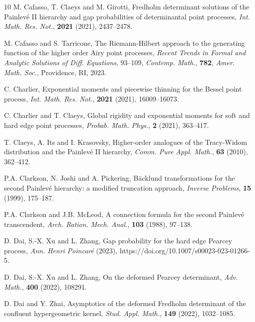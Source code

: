 \documentclass[11pt,a4paper]{article}
\numberwithin{equation}{section}
\begin{document}
\begin{thebibliography}{10}
M. Cafasso, T. Claeys and M. Girotti,
Fredholm determinant solutions of the
Painlev\'{e} II hierarchy and gap probabilities of determinantal point processes, {\it Int. Math. Res. Not.}, {\bf 2021} (2021), 2437--2478.


M. Cafasso and S. Tarricone,
The Riemann-Hilbert approach to the generating function of the higher order Airy point processes, {\it Recent Trends in Formal and Analytic Solutions of Diff. Equations}, 93--109, {\it Contemp. Math.}, {\bf 782}, {\it Amer. Math. Soc.}, Providence, RI, 2023. 

C. Charlier, Exponential moments and piecewise thinning for the Bessel point process, {\it Int. Math. Res. Not.}, {\bf 2021} (2021), 16009--16073.

C. Charlier and T. Claeys, Global rigidity and exponential moments for soft and hard edge point processes, {\it Probab. Math. Phys.}, {\bf 2} (2021), 363--417.





T. Claeys, A. Its and I. Krasovsky, Higher-order analogues of the Tracy-Widom
distribution and the Painlev\'{e} II hierarchy, {\it Comm. Pure Appl. Math.}, {\bf 63} (2010), 362--412.

P.A. Clarkson, N. Joshi and A. Pickering, B\"{a}cklund transformations for the second Painlev\'{e}
hierarchy: a modified truncation approach, {\it Inverse Problems}, {\bf 15} (1999), 175--187.

P.A. Clarkson and J.B. McLeod, A connection formula for the second Painlev\'{e} transcendent,
{\it Arch. Ration. Mech. Anal.}, {\bf 103} (1988), 97--138.

D. Dai, S.-X. Xu and L. Zhang,
Gap probability for the hard edge Pearcey process,
{\it Ann. Henri Poincar\'e} (2023), https://doi.org/10.1007/s00023-023-01266-5.

D. Dai, S.-X. Xu and L. Zhang,
On the deformed Pearcey determinant,
{\it Adv. Math.}, {\bf 400} (2022), 108291.

D. Dai and Y. Zhai,
Asymptotics of the deformed Fredholm determinant of the confluent hypergeometric kernel,
{\it Stud. Appl. Math.}, {\bf 149} (2022), 1032--1085.


\end{thebibliography}
\end{document}

